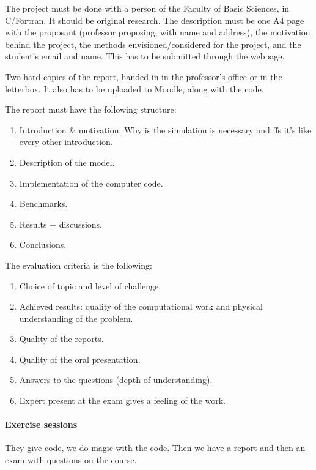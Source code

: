 \documentclass[palatino]{epflnotes}
\begin{document}
The project must be done with a person of the Faculty of Basic Sciences, in C/Fortran. It should be original research. The description must be one A4 page with the proposant (professor proposing, with name and address), the motivation behind the project, the methods envisioned/considered for the project, and the student's email and name. This has to be submitted through the webpage.

Two hard copies of the report, handed in in the professor's office or in the letterbox. It also has to be uploaded to Moodle, along with the code.

The report must have the following structure:

\begin{enumerate}
\item Introduction \& motivation. Why is the simulation is necessary and ffs it's like every other introduction.
\item Description of the model.
\item Implementation of the computer code.
\item Benchmarks.
\item Results + discussions.
\item Conclusions.
\end{enumerate}

The evaluation criteria is the following:

\begin{enumerate}
\item Choice of topic and level of challenge.
\item Achieved results: quality of the computational work and physical understanding of the problem.
\item Quality of the reports.
\item Quality of the oral presentation.
\item Answers to the questions (depth of understanding).
\item Expert present at the exam gives a feeling of the work.
\end{enumerate}

\paragraph{Exercise sessions} They give code, we do magic with the code. Then we have a report and then an exam with questions on the course.

%

\backmatter
\printindex
\end{document}
